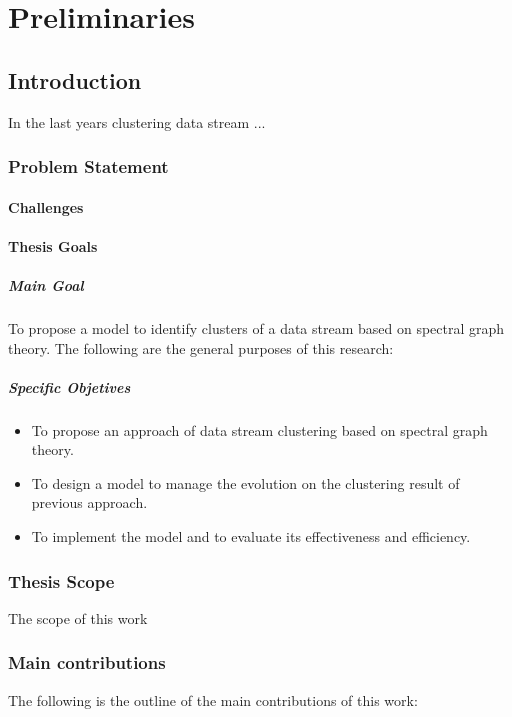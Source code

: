 \part{Preliminaries}
\chapter{Introduction}

In the last years clustering data stream ...


\section{Problem Statement}

\subsection{Challenges}


\subsection{Thesis Goals}
\subsubsection{Main Goal}
To propose a model to identify clusters of a data stream based on spectral graph theory. The following are the general purposes of this research:

\subsubsection{Specific Objetives}

\begin{itemize}
	\item To propose an approach of data stream clustering based on spectral graph theory.
	\item To design a model to manage the evolution on the clustering result of previous approach.
	\item To implement the model and to evaluate its effectiveness and efficiency.
\end{itemize}

\section{Thesis Scope}

The scope of this work


\section{Main contributions}
The following is the outline of the main contributions of this work:


